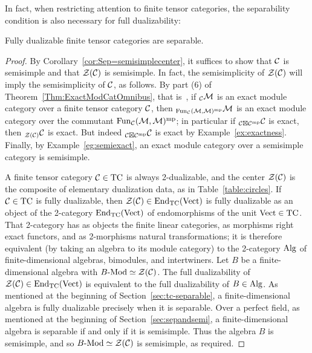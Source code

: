 \documentclass{amsart}
\begin{document}
In fact, when restricting attention to finite tensor categories, the separability condition is also necessary for full dualizability:
\begin{theorem} \label{thm:converse}
Fully dualizable finite tensor categories are separable.
\end{theorem}
\begin{proof}
By Corollary~\ref{cor:Sep=semisimplecenter}, it suffices to show that $\mathcal C$ is semisimple and that $\mathcal Z(\mathcal C)$ is semisimple.  In fact, the semisimplicity of $\mathcal Z(\mathcal C)$ will imply the semisimplicity of $\mathcal C$, as follows.  By part (6) of Theorem~\ref{Thm:ExactModCatOmnibus}, that is~\cite[Lemma 3.25]{EO-ftc}, if ${}_\mathcal C \mathcal M$ is an exact module category over a finite tensor category $\mathcal C$, then ${}_{\operatorname{Fun}_\mathcal C(\mathcal M,\mathcal M)^{\mathrm{mp}}} \mathcal M$ is an exact module category over the commutant $\operatorname{Fun}_\mathcal C(\mathcal M,\mathcal M)^{\mathrm{mp}}$; in particular if ${}_{\mathcal C \boxtimes \mathcal C^{\mathrm{mp}}} \mathcal C$ is exact, then ${}_{\mathcal Z(\mathcal C)} \mathcal C$ is exact.  But indeed ${}_{\mathcal C \boxtimes \mathcal C^{\mathrm{mp}}} \mathcal C$ is exact by Example~\ref{ex:exactness}.  Finally, by Example~\ref{eg:semiexact}, an exact module category over a semisimple category is semisimple.

A finite tensor category $\mathcal C \in \mathrm{TC}$ is always 2-dualizable, and the center $\mathcal Z(\mathcal C)$ is the composite of elementary dualization data, as in Table~\ref{table:circles}.  If $\mathcal C \in \mathrm{TC}$ is fully dualizable, then $\mathcal Z(\mathcal C) \in \operatorname{End}_{\mathrm{TC}}(\mathrm{Vect})$ is fully dualizable as an object of the 2-category $\operatorname{End}_{\mathrm{TC}}(\mathrm{Vect})$ of endomorphisms of the unit $\mathrm{Vect} \in \mathrm{TC}$.  That 2-category has as objects the finite linear categories, as morphisms right exact functors, and as 2-morphisms natural transformations; it is therefore equivalent (by taking an algebra to its module category) to the 2-category $\mathrm{Alg}$ of finite-dimensional algebras, bimodules, and intertwiners.  Let $B$ be a finite-dimensional algebra with $\Mod{B}{} \simeq \cZ(\cC)$.  The full dualizability of $\mathcal Z(\mathcal C) \in \operatorname{End}_{\mathrm{TC}}(\mathrm{Vect})$ is equivalent to the full dualizability of $B \in \mathrm{Alg}$.  As mentioned at the beginning of Section~\ref{sec:tc-separable}, a finite-dimensional algebra is fully dualizable precisely when it is separable.  Over a perfect field, as mentioned at the beginning of Section~\ref{sec:sepandsemi}, a finite-dimensional algebra is separable if and only if it is semisimple.  Thus the algebra $B$ is semisimple, and so $\Mod{B}{} \simeq \cZ(\cC)$ is semisimple, as required.
\end{proof}
\end{document}

